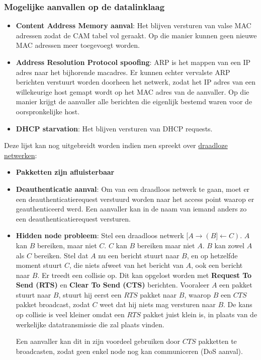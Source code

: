 \documentclass{report}
\begin{document}
	\subsubsection{Mogelijke aanvallen op de datalinklaag}
	\begin{itemize}
		\item \textbf{Content Address Memory aanval}: Het blijven versturen van valse MAC adressen zodat de CAM tabel vol geraakt. Op die manier kunnen geen nieuwe MAC adressen meer toegevoegt worden.
		\item \textbf{Address Resolution Protocol spoofing}: ARP is het mappen van een IP adres naar het bijhorende macadres. Er kunnen echter vervalste ARP berichten verstuurt worden doorheen het netwerk, zodat het IP adres van een willekeurige host gemapt wordt op het MAC adres van de aanvaller. Op die manier krijgt de aanvaller alle berichten die eigenlijk bestemd waren voor de oorspronkelijke host. 
		\item \textbf{DHCP starvation}: Het blijven versturen van DHCP requests.
	\end{itemize}
	Deze lijst kan nog uitgebreidt worden indien men spreekt over \underline{draadloze netwerken}:
	\begin{itemize}
		\item \textbf{Pakketten zijn afluisterbaar}
		\item \textbf{Deauthenticatie aanval}: Om van een draadloos netwerk te gaan, moet er een deauthenticatierequest verstuurd worden naar het access point waarop er geauthenticeerd werd. Een aanvaller kan in de naam van iemand anders zo een deauthenticatierequest versturen.
		\item \textbf{Hidden node probleem}: Stel een draadloos netwerk $[A \rightarrow (B] \leftarrow C)$. $A$ kan $B$ bereiken, maar niet $C$. $C$ kan $B$ bereiken maar niet $A$. $B$ kan zowel $A$ als $C$ bereiken. Stel dat $A$ nu een bericht stuurt naar $B$, en op hetzelfde moment stuurt $C$, die niets afweet van het bericht van $A$, ook een bericht naar $B$. Er treedt een collisie op. Dit kan opgelost worden met \textbf{Request To Send (RTS)} en \textbf{Clear To Send (CTS)} berichten. Vooraleer $A$ een pakket stuurt naar $B$, stuurt hij eerst een $RTS$ pakket naar $B$, waarop $B$ een $CTS$ pakket broadcast, zodat $C$ weet dat hij niets mag versturen naar $B$. De kans op collisie is veel kleiner omdat een $RTS$ pakket juist klein is, in plaats van de werkelijke datatransmissie die zal plaats vinden.

		Een aanvaller kan dit in zijn voordeel gebruiken door $CTS$ pakketten te broadcasten, zodat geen enkel node nog kan communiceren (DoS aanval).

	\end{itemize}
\end{document}
